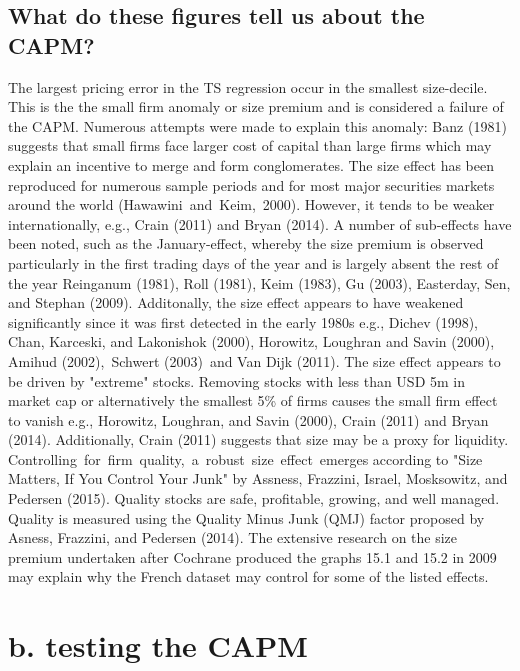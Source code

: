 \documentclass[]{article}
\begin{document}
\subsection*{What do these figures tell us about the CAPM?}	
The largest pricing error in the TS regression occur in the smallest size-decile. This is the the small firm anomaly or size premium and is considered a failure of the CAPM. Numerous attempts were made to explain this anomaly: Banz (1981) suggests that small firms face larger cost of capital than large firms which may explain an incentive to merge and form conglomerates. The size effect has been reproduced for numerous sample periods and for most major securities markets around the world (Hawawini and Keim, 2000). However, it tends to be weaker internationally, e.g., Crain (2011) and Bryan (2014). A number of sub-effects have been noted, such as the January-effect, whereby the size premium is observed particularly in the first trading days of the year and is largely absent the rest of the year Reinganum (1981), Roll (1981), Keim (1983), Gu (2003), Easterday, Sen, and Stephan (2009). Additonally, the size effect appears to have weakened significantly since it was first detected in the early 1980s e.g., Dichev (1998), Chan, Karceski, and Lakonishok (2000), Horowitz, Loughran and Savin (2000), Amihud (2002), Schwert (2003) and Van Dijk (2011). The size effect appears to be driven by "extreme" stocks. Removing stocks with less than USD 5m in market cap or alternatively the smallest 5\% of firms causes the small firm effect to vanish e.g., Horowitz, Loughran, and Savin (2000), Crain (2011) and Bryan (2014). Additionally, Crain (2011) suggests that size may be a proxy for liquidity. Controlling for firm quality, a robust size effect emerges according to "Size Matters, If You Control Your Junk" by Assness, Frazzini, Israel, Mosksowitz, and Pedersen (2015). Quality stocks are safe, profitable, growing, and well managed. Quality is measured using the Quality Minus Junk (QMJ) factor proposed by Asness, Frazzini, and Pedersen (2014). The extensive research on the size premium undertaken after Cochrane produced the graphs 15.1 and 15.2 in 2009 may explain why the French dataset may control for some of the listed effects.

\section*{b. testing the CAPM}
\end{document}
